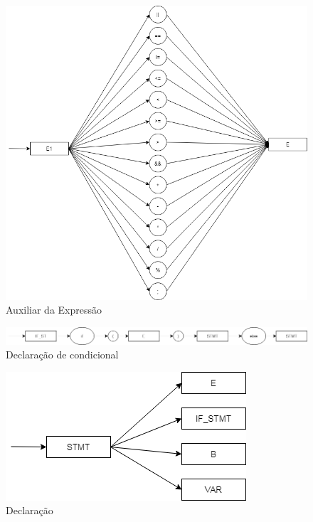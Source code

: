 \documentclass[]{article}
\numberwithin{equation}{section}
\begin{document}
\begin{center}
\begin{figure}[h!]
  \includegraphics[width=\linewidth]{./assets/expr_1.png}
  \caption{Auxiliar da Expressão}
\end{figure}
\end{center}

\begin{center}
\begin{figure}[h!]
  \includegraphics[width=\linewidth]{./assets/if_stmt.png}
  \caption{Declaração de condicional}
\end{figure}
\end{center}

\begin{center}
\begin{figure}[h!]
  \includegraphics[width=\linewidth]{./assets/stmt.png}
  \caption{Declaração}
\end{figure}
\end{center}
\end{document}
